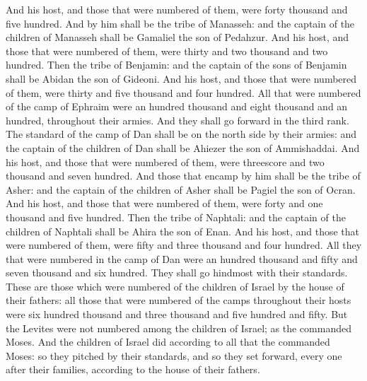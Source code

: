 \begin{biblechapter}
\verse And his host, and those that were numbered of them, were forty thousand and five hundred.
\verse And by him shall be the tribe of Manasseh: and the captain of the children of Manasseh shall be Gamaliel the son of Pedahzur.
\verse And his host, and those that were numbered of them, were thirty and two thousand and two hundred.
\verse Then the tribe of Benjamin: and the captain of the sons of Benjamin shall be Abidan the son of Gideoni.
\verse And his host, and those that were numbered of them, were thirty and five thousand and four hundred.
\verse All that were numbered of the camp of Ephraim were an hundred thousand and eight thousand and an hundred, throughout their armies. And they shall go forward in the third rank.
\verse The standard of the camp of Dan shall be on the north side by their armies: and the captain of the children of Dan shall be Ahiezer the son of Ammishaddai.
\verse And his host, and those that were numbered of them, were threescore and two thousand and seven hundred.
\verse And those that encamp by him shall be the tribe of Asher: and the captain of the children of Asher shall be Pagiel the son of Ocran.
\verse And his host, and those that were numbered of them, were forty and one thousand and five hundred.
\verse Then the tribe of Naphtali: and the captain of the children of Naphtali shall be Ahira the son of Enan.
\verse And his host, and those that were numbered of them, were fifty and three thousand and four hundred.
\verse All they that were numbered in the camp of Dan were an hundred thousand and fifty and seven thousand and six hundred. They shall go hindmost with their standards.
\verse These are those which were numbered of the children of Israel by the house of their fathers: all those that were numbered of the camps throughout their hosts were six hundred thousand and three thousand and five hundred and fifty.
\verse But the Levites were not numbered among the children of Israel; as the \LORD commanded Moses.
\verse And the children of Israel did according to all that the \LORD commanded Moses: so they pitched by their standards, and so they set forward, every one after their families, according to the house of their fathers.
\end{biblechapter}

